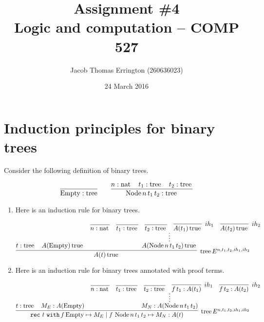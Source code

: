 \documentclass[11pt,letterpaper]{article}
\author{Jacob Thomas Errington (260636023)}
\title{Assignment \#4\\Logic and computation -- COMP 527}
\date{24 March 2016}
\DeclareMathOperator{\opNode}{Node}
\DeclareMathOperator{\opTree}{tree}
\DeclareMathOperator{\opNat}{nat}
\DeclareMathOperator{\opTrue}{true}
\DeclareMathOperator{\opRec}{\mathtt{rec}}
\DeclareMathOperator{\opWith}{\mathtt{with}}
\newcommand{\emptyTree}{\mathrm{Empty}}
\newcommand{\nodeTree}[3]{\opNode{#1\,#2\,#3}}
\newcommand{\tree}{\opTree{}}
\newcommand{\nat}{\opNat{}}
\newcommand{\with}{\opWith{}}
\newcommand{\case}[3]{#1\,#2\mapsto #3}
\newcommand{\orCase}{\mid}
\newcommand{\rec}[1]{\opRec{\,#1\,}}
\renewcommand{\t}{\opTrue{}}
\begin{document}
\maketitle

\section{Induction principles for binary trees}

Consider the following definition of binary trees.

\begin{align*}
    \infer{\emptyTree : \text{tree}}{}
    &
    \quad
    &
    \infer{\nodeTree{n}{t_1}{t_2} : \tree}{
        n : \nat & t_1 : \tree & t_2 : \tree
    }
\end{align*}

\begin{enumerate}
    \item Here is an induction rule for binary trees.

        \begin{equation*}
            \infer[\tree E^{n, t_1, t_2, ih_1, ih_2}]{A(t) \t}{
                t : \tree
                &
                A(\emptyTree) \t
                &
                \infer*{A(\nodeTree{n}{t_1}{t_2}) \t}{
                    \infer{n : \nat}{}
                    &
                    \infer{t_1 : \tree}{}
                    &
                    \infer{t_2 : \tree}{}
                    &
                    \infer[ih_1]{A(t_1) \t}{}
                    &
                    \infer[ih_2]{A(t_2) \t}{}
                }
            }
        \end{equation*}

    \item Here is an induction rule for binary trees annotated with proof
        terms.

        \begin{equation*}
            \infer[\tree E^{n, t_1, t_2, ih_1, ih_2}]{
                \rec{t} \with
                \case{f}{\emptyTree}{M_E}
                \orCase
                \case{f}{\nodeTree{n}{t_1}{t_2}}{M_N}
                : A(t)
            }{
                t : \tree
                &
                M_E : A(\emptyTree)
                &
                \infer*{M_N : A(\nodeTree{n}{t_1}{t_2})}{
                    \infer{n : \nat}{}
                    &
                    \infer{t_1 : \tree}{}
                    &
                    \infer{t_2 : \tree}{}
                    &
                    \infer[ih_1]{f\, t_1 : A(t_1)}{}
                    &
                    \infer[ih_2]{f\, t_2 : A(t_2)}{}
                }
            }
        \end{equation*}


\end{enumerate}
\end{document}
